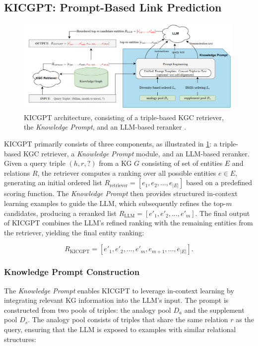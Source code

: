 \documentclass[12pt,a4paper]{article}
\begin{document}
\subsection{KICGPT: Prompt-Based Link Prediction}
\label{sec:method:kicgpt}

\begin{figure}
    \centering
    \includegraphics[width=0.99\textwidth]{figures/KICGPTarchitecture}
    \caption{KICGPT architecture, consisting of a triple-based KGC retriever, the \emph{Knowledge Prompt}, and an LLM-based reranker \cite{wei2023kicgpt}.}
    \label{fig:KICGPTarchitecture}
\end{figure}

KICGPT primarily consists of three components, as illustrated in \cref{fig:KICGPTarchitecture}: a triple-based KGC retriever, a \emph{Knowledge Prompt} module, and an LLM-based reranker.
Given a query triple \( (h, r, ?) \) from a KG \(G\) consisting of set of entities \(E\) and relations \(R\), the retriever computes a ranking over all possible entities \( e \in E \), generating an initial ordered list \( R_{\text{retriever}} = [e_1, e_2, ..., e_{|E|}] \) based on a predefined scoring function. The \emph{Knowledge Prompt} then provides structured in-context learning examples to guide the LLM, which subsequently refines the top-\( m \) candidates, producing a reranked list \( R_{\text{LLM}} = [e'_1, e'_2, ..., e'_m] \).
The final output of KICGPT combines the LLM’s refined ranking with the remaining entities from the retriever, yielding the final entity ranking:

\[
    R_{\text{KICGPT}} = [e'_1, e'_2, ..., e'_m, e_{m+1}, ..., e_{|E|}].
\]

\subsubsection{Knowledge Prompt Construction}

The \emph{Knowledge Prompt} enables KICGPT to leverage in-context learning by integrating relevant KG information into the LLM’s input.
The prompt is constructed from two pools of triples: the analogy pool \( D_a \) and the supplement pool \( D_s \).
The analogy pool consists of triples that share the same relation \( r \) as the query, ensuring that the LLM is exposed to examples with similar relational structures:
\end{document}
